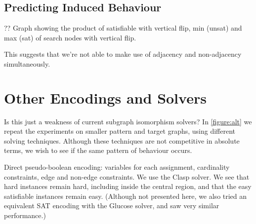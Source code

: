 \documentclass[letterpaper]{article}
\begin{document}
\lipsum[8]

\begin{figure*}[t]
    
    \caption{Behaviour of algorithms on the induced variant, shown in the style
    of \cref{figure:non-induced}. The second row shows a bound on the satisfiable region, by
    considering where a \emph{non-}induced isomorphism may also be a non-induced isomorphism between
    complement graphs.}\label{figure:induced}
\end{figure*}

\subsection{Predicting Induced Behaviour}

?? Graph showing the product of satisfiable with vertical flip, min (unsat) and max (sat) of search
nodes with vertical flip.

This suggests that we're not able to make use of adjacency and non-adjacency simultaneously.

\lipsum[9]

\lipsum[10]

\section{Other Encodings and Solvers}

\begin{figure*}[t]
    
    \caption{Behaviour of other solvers on the induced variant on smaller graphs, shown in the style of
        \cref{figure:non-induced}. The second row shows the number of search nodes used by the Glasgow
        algorithm, the third row shows the number of decisions made by the Clasp pseudo-boolean solver,
        the fourth row shows the number of search nodes used by a clique encoding, and the fifth a mixed
        integer encoding with Gurobi.}\label{figure:alt}
\end{figure*}

Is this just a weakness of current subgraph isomorphism solvers? In \cref{figure:alt} we repeat the
experiments on smaller pattern and target graphs, using different solving techniques. Although these
techniques are not competitive in absolute terms, we wish to see if the same pattern of behaviour
occurs.

Direct pseudo-boolean encoding: variables for each assignment, cardinality constraints, edge and
non-edge constraints. We use the Clasp solver. We see that hard instances remain hard, including
inside the central region, and that the easy satisfiable instances remain easy. (Although not
presented here, we also tried an equivalent SAT encoding with the Glucose solver, and saw very
similar performance.)
\end{document}

